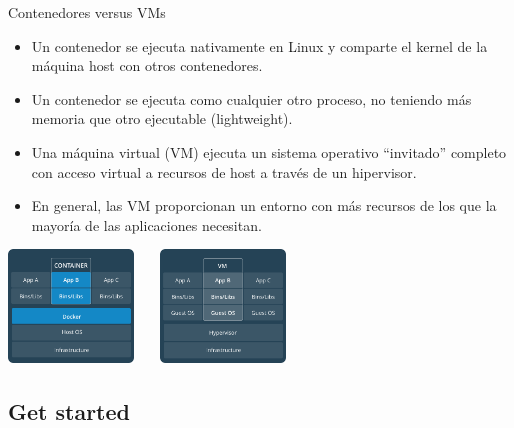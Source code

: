 \begin{frame}{Contenedores versus VMs}
 \begin{itemize}
  \item Un contenedor se ejecuta nativamente en Linux y comparte el kernel de la máquina host con otros contenedores. 
  \item Un contenedor se ejecuta como cualquier otro proceso, no teniendo más memoria que otro ejecutable (lightweight).
  \item Una máquina virtual (VM) ejecuta un sistema operativo ``invitado'' completo con acceso virtual a recursos de host a través de un hipervisor. 
  \item En general, las VM proporcionan un entorno con más recursos de los que la mayoría de las aplicaciones necesitan. 
 \end{itemize}
 \begin{center}
  \includegraphics[height=3cm]{img/contenedor.png}~~~
  \includegraphics[height=3cm]{img/VM.png}
 \end{center}
\end{frame}

\subsection{Get started}

